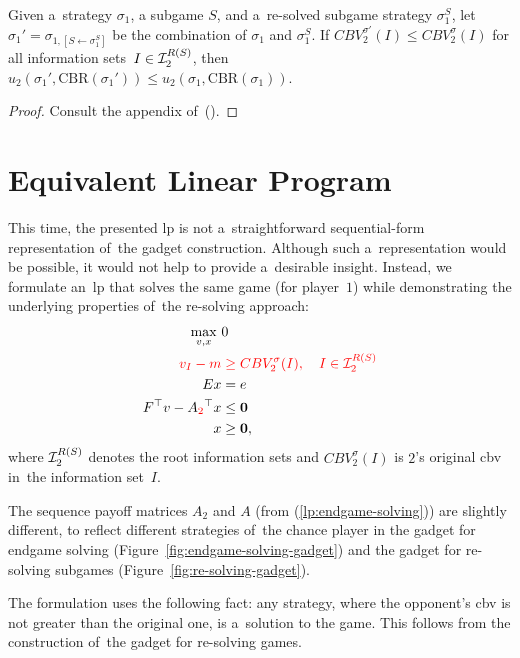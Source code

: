 \begin{thm}
  \label{thm:cf-val-and-utility}
  Given a~strategy $\sigma_1$, a subgame $S$, and a~re-solved subgame strategy $\sigma_1^S$, let $\sigma_1' = \sigma_{1, [S \leftarrow \sigma_1^S]}$ be the combination of $\sigma_1$ and $\sigma_1^S$.
  If $CBV_2^{\sigma'}(I) \leq  CBV_2^{\sigma}(I)$ for all information sets~$I\in\mathcal{I}_2^{R(S)}$, then $u_2(\sigma_1', \textrm{CBR}(\sigma_1')) \leq  u_2(\sigma_1, \textrm{CBR}(\sigma_1))$.
\end{thm}
\begin{proof}
  Consult the appendix of~(\cite{BurchJohansonBowling13}).
\end{proof}

\section{Equivalent Linear Program}
This time, the presented \acrshort{lp} is not a~straightforward sequential-form representation of~the gadget construction.
Although such a~representation would be possible, it would not help to provide a~desirable insight.
Instead, we formulate an~\acrshort{lp} that solves the same game (for player~$1$) while demonstrating the underlying properties of~the re-solving approach:
\begin{equation}
  \label{lp:cfr-d}
  \begin{split}
    \max_{v, x}\ &0 \\
    \color{red}
      v_I - m &
    \color{red}
      \ge CBV_2^\sigma(I), \quad I \in \mathcal{I}_2^{R(S)}\\ 
    Ex &= e \\
    F^\top v - A_{\color{red}2}^\top x &\le \boldsymbol{0} \\
    x &\ge \boldsymbol{0},
  \end{split}
\end{equation}
where $\mathcal{I}_2^{R(S)}$ denotes the root information sets and $CBV_2^\sigma(I)$ is $2$'s original \acrlong{cbv} in~the information set~$I$.

The sequence payoff matrices $A_2$ and $A$ (from (\ref{lp:endgame-solving})) are slightly different, to reflect different strategies of~the chance player in the gadget for endgame solving (Figure~\ref{fig:endgame-solving-gadget}) and the gadget for re-solving subgames (Figure~\ref{fig:re-solving-gadget}).

The formulation uses the following fact:
any strategy, where the opponent's \acrshort{cbv} is not greater than the original one, is a~solution to the game.
This follows from the construction of~the gadget for re-solving games.


